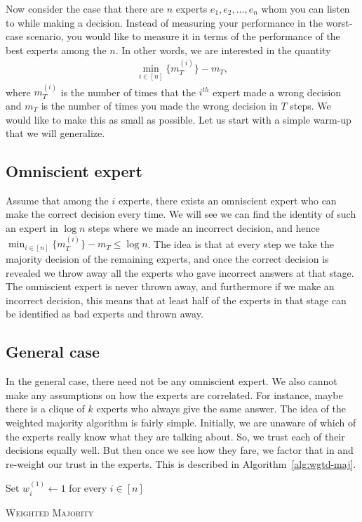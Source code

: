 Now consider the case that there are $n$ experts $e_1, e_2, \ldots, e_n$ whom you can listen to while making a decision. Instead of measuring your performance in the worst-case scenario, you would like to measure it in terms of the performance of the best experts among the $n$. In other words, we are interested in the quantity
\begin{align*}
	\min_{i\in [n]} \{ m^{(i)}_T \} - m_T,
\end{align*}
where $m^{(i)}_T$ is the number of times that the $i^{th}$ expert made a wrong decision and $m_T$ is the number of times you made the wrong decision in $T$ steps. We would like to make this as small as possible. Let us start with a simple warm-up that we will generalize.

\subsection{Omniscient expert}

Assume that among the $i$ experts, there exists an omniscient expert who can make the correct decision every time. We will see we can find the identity of such an expert in $\log n$ steps where we made an incorrect decision, and hence $\min_{i\in [n]} \{ m^{(i)}_T \} - m_T \leq \log n$. The idea is that at every step we take the majority decision of the remaining experts, and once the correct decision is revealed we throw away all the experts who gave incorrect answers at that stage. The omniscient expert is never thrown away, and furthermore if we make an incorrect decision, this means that at least half of the experts in that stage can be identified as bad experts and thrown away.

\subsection{General case}

In the general case, there need not be any omniscient expert. We also cannot make any assumptions on how the experts are correlated. For instance, maybe there is a clique of $k$ experts who always give the same answer. The idea of the weighted majority algorithm is fairly simple. Initially, we are unaware of which of the experts really know what they are talking about. So, we trust each of their decisions equally well. But then once we see how they fare, we factor that in and re-weight our trust in the experts. This is described in Algorithm~\ref{alg:wgtd-maj}.

\begin{algorithm}%
	Set $w_i^{(1)} \gets 1$ for every $i \in [n]$
	
	\caption{\textsc{Weighted Majority}}
	\label{alg:wgtd-maj}
\end{algorithm}

